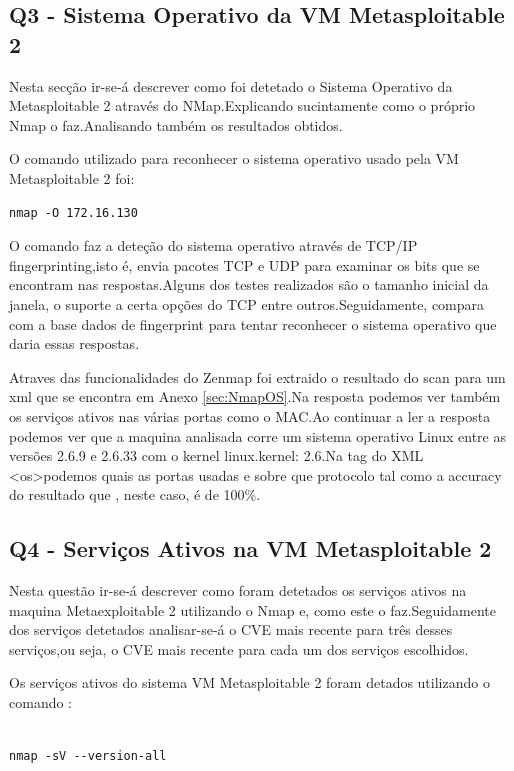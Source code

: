 \subsection{Q3 - Sistema Operativo da VM Metasploitable 2}

Nesta secção ir-se-á descrever como foi detetado o Sistema Operativo da Metasploitable 2 através do NMap.Explicando sucintamente como o próprio Nmap o faz.Analisando também os resultados obtidos.

O comando utilizado para reconhecer o sistema operativo usado pela VM Metasploitable 2 foi:
\begin{lstlisting}
nmap -O 172.16.130
\end{lstlisting}

O comando faz a deteção do sistema operativo através de TCP/IP fingerprinting,isto é, envia pacotes TCP e UDP para examinar os bits que se encontram nas respostas.Alguns dos testes realizados são o tamanho inicial da janela, o suporte a certa opções do TCP entre outros.Seguidamente, compara com a base dados de fingerprint para tentar reconhecer o sistema operativo que daria essas respostas.

Atraves das funcionalidades do Zenmap foi extraido o resultado do scan para um xml que se encontra em Anexo \ref{sec:NmapOS}.Na resposta podemos ver também os serviços ativos nas várias portas como o MAC.Ao continuar a ler a resposta podemos ver que a maquina analisada corre um sistema operativo Linux entre as versões 2.6.9 e 2.6.33 com o kernel linux.kernel: 2.6.Na tag do XML \textless os\textgreater podemos quais as portas usadas e sobre que protocolo tal como a accuracy do resultado que , neste caso, é de 100\%.


\subsection{Q4 - Serviços Ativos na VM Metasploitable 2}

Nesta questão ir-se-á descrever como foram detetados os serviços ativos na maquina Metaexploitable 2 utilizando o Nmap e, como este o faz.Seguidamente dos serviços detetados analisar-se-á o CVE mais recente para três desses serviços,ou seja, o CVE mais recente para cada um dos serviços escolhidos.

Os serviços ativos do sistema VM Metasploitable 2 foram detados utilizando o comando :

\begin{lstlisting}

nmap -sV --version-all

\end{lstlisting}

